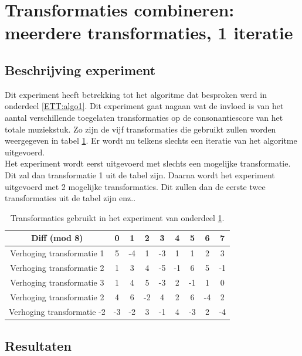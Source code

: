 \section{Transformaties combineren: meerdere transformaties, 1 iteratie}
\label{experiment:2}
\subsection{Beschrijving experiment}
Dit experiment heeft betrekking tot het algoritme dat besproken werd in onderdeel \ref{ETT:algo1}. Dit experiment gaat nagaan wat de invloed is van het aantal verschillende toegelaten transformaties op de consonantiescore van het totale muziekstuk. Zo zijn de vijf transformaties die gebruikt zullen worden weergegeven in tabel \ref{tabel:exp2}. Er wordt nu telkens slechts een iteratie van het algoritme uitgevoerd.\\
Het experiment wordt eerst uitgevoerd met slechts een mogelijke transformatie. Dit zal dan transformatie 1 uit de tabel zijn. Daarna wordt het experiment uitgevoerd met 2 mogelijke transformaties. Dit zullen dan de eerste twee transformaties uit de tabel zijn enz..

\begin{table}
  \centering
  \begin{tabular}{c | c c c c c c c c }
    Diff (mod 8) & 0 & 1 & 2 & 3 & 4 & 5 & 6 & 7 \\
    \hline
    \hline
    Verhoging transformatie 1 & 5 & -4 & 1 & -3 & 1 & 1 & 2 & 3 \\
    \hline
    Verhoging transformatie 2 & 1 & 3 & 4 & -5 & -1 & 6 & 5 & -1 \\
    \hline
    Verhoging transformatie 3 & 1 & 4 & 5 & -3 & 2 & -1 & 1 & 0 \\
    \hline
    Verhoging transformatie 2 & 4 & 6 & -2 & 4 & 2 & 6 & -4 & 2 \\
    \hline
    Verhoging transformatie -2 & -3 & -2 & 3 & -1 & 4 & -3 & 2 & -4 \\
  \end{tabular}
  \caption{Transformaties gebruikt in het experiment van onderdeel \ref{experiment:2}.}
  \label{tabel:exp2}
\end{table}

\subsection{Resultaten}

